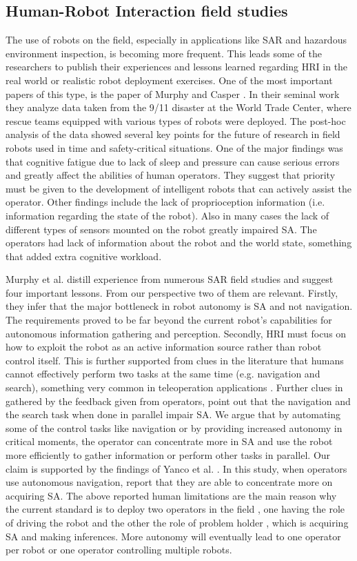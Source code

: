 \documentclass[a4paper,12pt,oneside,openright]{bhamthesis}
\begin{document}
\subsection{Human-Robot Interaction field studies}
\label{section:HRIfield}
The use of robots on the field, especially in applications like SAR and hazardous environment inspection, is becoming more frequent. This leads some of the researchers to publish their experiences and lessons learned regarding HRI in the real world or realistic robot deployment exercises. One of the most important papers of this type, is the paper of Murphy and Casper \cite{CasperMurphy911}. In their seminal work they analyze data taken from the 9/11 disaster at the World Trade Center, where rescue teams equipped with various types of robots were deployed. The post-hoc analysis of the data showed several key points for the future of research in field robots used in time and safety-critical situations. One of the major findings was that cognitive fatigue due to lack of sleep and pressure can cause serious errors and greatly affect the abilities of human operators. They suggest that priority must be given to the development of intelligent robots that can actively assist the operator. Other findings include the lack of proprioception information (i.e. information regarding the state of the robot). Also in many cases the lack of different types of sensors mounted on the robot greatly impaired SA. The operators had lack of information about the robot and the world state, something that added extra cognitive workload. 

Murphy et al. \cite{Murphy2005a} distill experience from numerous SAR field studies and suggest four important lessons. From our perspective two of them are relevant. Firstly, they infer that the major bottleneck in robot autonomy is SA and not navigation. The requirements proved to be far beyond the current robot's capabilities for autonomous information gathering and perception. Secondly, HRI must focus on how to exploit the robot as an active information source rather than robot control itself.  This is further supported from clues in the literature that humans cannot effectively perform two tasks at the same time (e.g. navigation and search), something very common in teleoperation applications \cite{Casper2002}. Further clues in \cite{Yanco2006} gathered by the feedback given from operators, point out that the navigation and the search task when done in parallel impair SA. We argue that by automating some of the control tasks like navigation or by providing increased autonomy in critical moments, the operator can concentrate more in SA and use the robot more efficiently to gather information or perform other tasks in parallel. Our claim is supported by the findings of Yanco et al. \cite{Yanco_HRI_SA_04}. In this study, when operators use autonomous navigation, report that they are able to concentrate more on acquiring SA. The above reported human limitations are the main reason why the current standard is to deploy two operators in the field \cite{Burke2004b}, one having the role of driving the robot and the other the role of problem holder \cite{Murphy2004}, which is acquiring SA and making inferences. More autonomy will eventually lead to one operator per robot or one operator controlling multiple robots.
\end{document}
